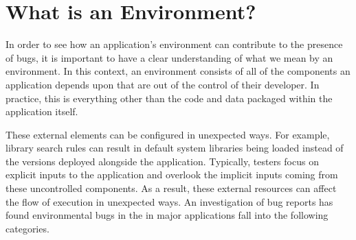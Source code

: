 \chapter{What is an Environment?}
\label{chap:background}

In order to see how an application's environment can contribute to the presence of bugs, it is important
to have a clear understanding
of what we mean by an environment. In this context, an environment consists of
all of the components an application depends upon
that are out of the control of their developer.
In practice, this is everything other than the code and data packaged
within the application itself.


These external elements can be
configured in unexpected ways.
For example, library search rules can result in default system libraries
being loaded instead of
the versions deployed alongside the application.
Typically, testers
focus on explicit inputs to the application
and overlook the implicit inputs
coming from these uncontrolled components. As a result, these external resources can affect the flow of execution in unexpected ways.
An investigation of bug reports has found environmental bugs in the in major applications fall into the 
following categories.

